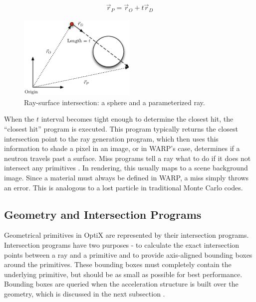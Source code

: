 \begin{equation}
\label{parameterized_ray}
\begin{split}
\vec{r}_P = \vec{r}_O + t \vec{r}_D 
\end{split}
\end{equation}

\begin{figure}[h!] 
  \centering
    \includegraphics[width=0.5\textwidth]{graphics/ray_surface.eps}
     \caption{Ray-surface intersection: a sphere and a parameterized ray. \label{ray_surface}}
\end{figure}

When the $t$ interval becomes tight enough to determine the closest hit, the ``closest hit'' program is executed.  This program typically returns the closest intersection point to the ray generation program, which then uses this information to shade a pixel in an image, or in WARP's case, determines if a neutron travels past a surface.  Miss programs tell a ray what to do if it does not intersect any primitives \cite{optix}.  In rendering, this usually maps to a scene background image.  Since a material must always be defined in WARP, a miss simply throws an error. This is analogous to a lost particle in traditional Monte Carlo codes.

\subsection{Geometry and Intersection Programs}

Geometrical primitives in OptiX are represented by their intersection programs.  Intersection programs have two purposes - to calculate the exact intersection points between a ray and a primitive and to provide axis-aligned bounding boxes around the primitives.  These bounding boxes must completely contain the underlying primitive, but should be as small as possible for best performance.  Bounding boxes are queried when the acceleration structure is built over the geometry, which is discussed in the next subsection \cite{optix}.  

